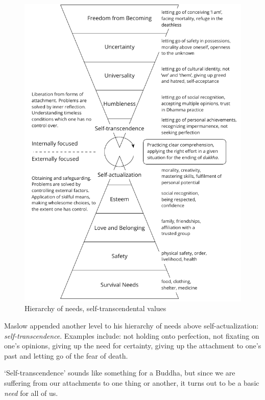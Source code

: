 \begin{figure}[h]
\vspace*{-15pt}
\caption{Hierarchy of needs, self-transcendental values}\label{fig-self-transcendental}
\bigskip
\includegraphics[width=\linewidth]{./manuscript/tex/diagrams/self-transcendental-values.pdf}
\end{figure}

\clearpage
\normalpagelayout

Maslow appended another level to his hierarchy of needs above
self-actualization: \emph{self-transcendence}. Examples include: not
holding onto perfection, not fixating on one's opinions, giving up the
need for certainty, giving up the attachment to one's past and letting
go of the fear of death.

`Self-transcendence' sounds like something for a Buddha, but since we
are suffering from our attachments to one thing or another, it turns out
to be a basic \emph{need} for all of us.

